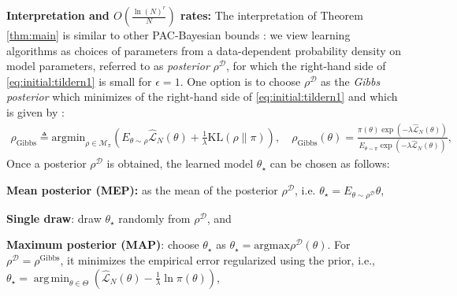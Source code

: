 \documentclass{article}
\newcommand{\train}{\mathcal{D}}
\newcommand{\KL}{\mathrm{KL}}
\DeclareMathOperator*{\argmax}{arg\,max}
\DeclareMathOperator*{\argmin}{arg\,min}
\renewcommand{\KL}{\mathrm{KL}}
\begin{document}
\textbf{Interpretation and $O(\frac{\ln(N)^{r}}{N})$ rates:}
The interpretation of Theorem \ref{thm:main} is similar to other PAC-Bayesian bounds \cite{alquier2021userfriendly}:
we view learning algorithms as choices of parameters from a  data-dependent probability density on model parameters, 
  referred to as \emph{posterior}
 $\rho^{\train}$, for which 
 the right-hand side of \eqref{eq:initial:tildern1} is small for $\epsilon=1$.
One option is to choose $\rho^{\train}$ as the \emph{Gibbs posterior} 
which minimizes of the right-hand side of \eqref{eq:initial:tildern1} 
and which is given by \cite[Definition 2.1]{alquier2021userfriendly}:
\begin{equation*}
\begin{aligned}
\rho_{\text{Gibbs}} \triangleq  \mathrm{arg min}_{\rho \in \mathcal{M}_{\pi}}
\left(E_{\theta\sim\rho}\hat{\mathcal{L}}_N(\theta) + 
          \frac{1}{\lambda}  \KL(\rho\|\pi)  \right), \quad 
\rho_{\text{Gibbs}}(\theta)=\frac{\pi(\theta)\exp(-\lambda \hat{\mathcal{L}}_N(\theta))}{E_{\theta\sim\pi}\exp(-\lambda \hat{\mathcal{L}}_N(\theta))}, 
\end{aligned}
\end{equation*}
Once a posterior $\rho^{\train}$ is obtained, the learned model 
 $\theta_{\star}$
 can be chosen as follows:
 \par
 \textbf{Mean posterior (MEP):} 
 as the mean of the posterior
 $\rho^{\train}$, i.e. $\theta_{\star}=E_{\theta \sim \rho^{\train}} \theta$,
 \par
\textbf{Single draw}:
   draw $\theta_{\star}$ randomly from $\rho^{\train}$,  and
\par
\textbf{Maximum posterior (MAP)}:
   choose $\theta_{\star}$ as %
    $\theta_{\star}=\mathrm{arg max} \rho^{\train}(\theta)$.
    For $\rho^{\train}=\rho^{\mathrm{Gibbs}}$,
     it minimizes the empirical error regularized using the prior, i.e.,
    $\theta_{\star}=\argmin_{\theta\in\Theta}\left ( \hat{\mathcal{L}}_N(\theta) - \frac{1}{\lambda} \ln\pi(\theta) \right )$,
\end{document}

